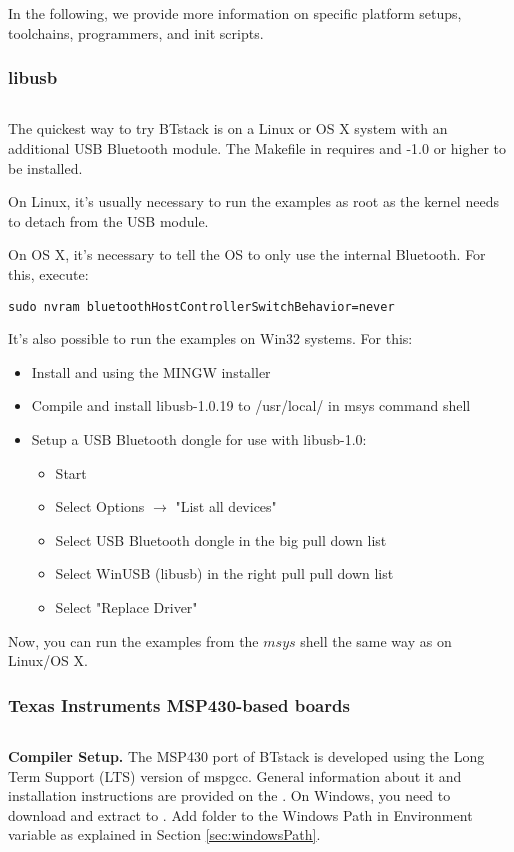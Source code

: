 
In the following, we provide more information on specific platform setups, toolchains, programmers, and init scripts.
\subsubsection{libusb}
$ $

The quickest way to try BTstack is on a Linux or OS X system with an additional USB Bluetooth module. The Makefile in  requires \pkgconfig{} and \libusb{}-1.0 or higher to be installed. 

On Linux, it's usually necessary to run the examples as root as the kernel needs to detach from the USB module.

On OS X, it's necessary to tell the OS to only use the internal Bluetooth. For this, execute:
\begin{lstlisting}
sudo nvram bluetoothHostControllerSwitchBehavior=never
\end{lstlisting}

It's also possible to run the examples on Win32 systems. For this:
\begin{itemize}
\item Install \MSYS{} and \MINGW{} using the MINGW installer
\item Compile and install libusb-1.0.19 to /usr/local/ in msys command shell
\item Setup a USB Bluetooth dongle for use with libusb-1.0:
	\begin{itemize}
	\item Start \Zadig{}
	\item Select Options $\rightarrow$ "List all devices"
	\item Select USB Bluetooth dongle in the big pull down list
	\item Select WinUSB (libusb) in the right pull pull down list
	\item Select "Replace Driver"
	\end{itemize}
\end{itemize}
Now, you can run the examples from the $msys$ shell the same way as on Linux/OS X.

\subsubsection{Texas Instruments MSP430-based boards}
$ $

\textbf{Compiler Setup.} The MSP430 port of BTstack is developed using the Long Term Support (LTS) version of mspgcc. General information about it and installation instructions are provided on the \MSPGCCWiki{}. On Windows, you need to download and extract \mspgcc{} to . Add  folder to the Windows Path in Environment variable as explained in Section \ref{sec:windowsPath}.

